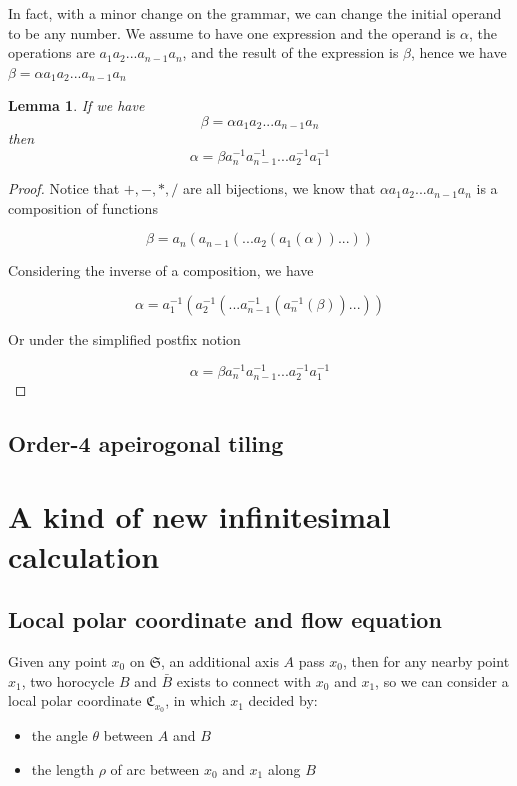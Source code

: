 \documentclass{article}
\newtheorem{lemma}{Lemma}
\begin{document}
In fact, with a minor change on the grammar, we can change the initial operand to be any number.
We assume to have one expression and the operand is $\alpha$, the operations are $a_1 a_2 ... a_{n-1} a_n$, and the
result of the expression is $\beta$, hence we have $\beta = \alpha a_1 a_2 ... a_{n-1} a_n$

\begin{lemma}
\label{lemma:inverse}
If we have
$$\beta = \alpha a_1 a_2 ... a_{n-1} a_n$$
then
$$\alpha = \beta a_n^{-1} a_{n-1}^{-1} ... a_2^{-1} a_1^{-1}$$
\end{lemma}

\begin{proof}
Notice that $+, -, *, /$ are all bijections, we know that $\alpha a_1 a_2 ... a_{n-1} a_n$ is a composition of functions

$$\beta = a_n( a_{n-1}( ... a_2( a_1(\alpha) ) ... ) )$$

Considering the inverse of a composition, we have

$$\alpha = a_1^{-1}( a_2^{-1}( ... a_{n-1}^{-1}( a_n^{-1}(\beta) ) ... ) )$$

Or under the simplified postfix notion

$$\alpha = \beta a_n^{-1} a_{n-1}^{-1} ... a_2^{-1} a_1^{-1}$$

\qedhere

\end{proof}


\subsection{Order-4 apeirogonal tiling}\label{sec:o4ataamt}


\newpage

\section{A kind of new infinitesimal calculation}\label{sec:akonic}

\subsection{Local polar coordinate and flow equation}\label{sec:lpcafe}

Given any point $x_0$ on $\mathfrak{S}$, an additional axis $A$ pass $x_0$, then for any nearby point $x_1$, two
horocycle $B$ and $\bar{B}$ exists to connect with $x_0$ and $x_1$, so we can consider a local polar coordinate
$\mathfrak{C}_{x_0}$, in which $x_1$ decided by:
\begin{itemize}
    \item the angle $\theta$ between $A$ and $B$
    \item the length $\rho$ of arc between $x_0$ and $x_1$ along $B$
\end{itemize}
\end{document}
